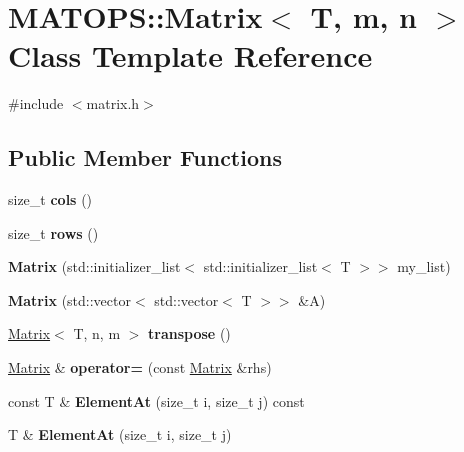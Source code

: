 \hypertarget{classMATOPS_1_1Matrix}{}\section{M\+A\+T\+O\+PS\+:\+:Matrix$<$ T, m, n $>$ Class Template Reference}
\label{classMATOPS_1_1Matrix}


{\ttfamily \#include $<$matrix.\+h$>$}

\subsection*{Public Member Functions}
\begin{DoxyCompactItemize}
\item 
\mbox{\label{classMATOPS_1_1Matrix_a4fde0b19d8cd6ca18c24d836355a2e5a}} 
size\+\_\+t {\bfseries cols} ()
\item 
\mbox{\label{classMATOPS_1_1Matrix_a3eb38202054437704ba4ceba78959d5b}} 
size\+\_\+t {\bfseries rows} ()
\item 
\mbox{\label{classMATOPS_1_1Matrix_ab665ea80cebcf2656c51dac5a86efd7b}} 
{\bfseries Matrix} (std\+::initializer\+\_\+list$<$ std\+::initializer\+\_\+list$<$ T $>$$>$ my\+\_\+list)
\item 
\mbox{\label{classMATOPS_1_1Matrix_a5d943d697baea1fcefdd062a8300dd74}} 
{\bfseries Matrix} (std\+::vector$<$ std\+::vector$<$ T $>$$>$ \&A)
\item 
\mbox{\label{classMATOPS_1_1Matrix_aa278f18f2e1324c56d965cd5e033b4eb}} 
\hyperlink{classMATOPS_1_1Matrix}{Matrix}$<$ T, n, m $>$ {\bfseries transpose} ()
\item 
\mbox{\label{classMATOPS_1_1Matrix_a4512ee518878124f54e3c596d2847d86}} 
\hyperlink{classMATOPS_1_1Matrix}{Matrix} \& {\bfseries operator=} (const \hyperlink{classMATOPS_1_1Matrix}{Matrix} \&rhs)
\item 
\mbox{\label{classMATOPS_1_1Matrix_a9eabd6b452bd01040c9ecaadc2ad6562}} 
const T \& {\bfseries Element\+At} (size\+\_\+t i, size\+\_\+t j) const
\item 
\mbox{\label{classMATOPS_1_1Matrix_a28edfa65a7b0f5cbeb96d91bfaee4d6a}} 
T \& {\bfseries Element\+At} (size\+\_\+t i, size\+\_\+t j)
\end{DoxyCompactItemize}
